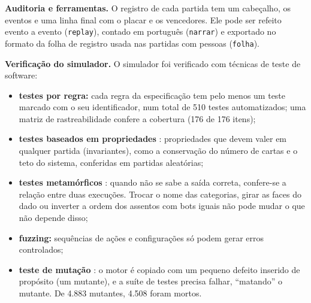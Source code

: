 \textbf{Auditoria e ferramentas.} O registro de cada partida tem um cabeçalho, os eventos e uma linha final com
o placar e os vencedores. Ele pode ser refeito evento a evento (\texttt{replay}), contado em português
(\texttt{narrar}) e exportado no formato da folha de registro usada nas partidas com pessoas (\texttt{folha}).

\textbf{Verificação do simulador.} O simulador foi verificado com técnicas de teste de software:
\begin{itemize}
  \item \textbf{testes por regra:} cada regra da especificação tem pelo menos um teste marcado com o seu
    identificador, num total de 510 testes automatizados; uma matriz de rastreabilidade confere a cobertura (176
    de 176 itens);
  \item \textbf{testes baseados em propriedades} \cite{claessen2000,maciver2019}: propriedades que devem valer em
    qualquer partida (invariantes), como a conservação do número de cartas e o teto do sistema, conferidas em
    partidas aleatórias;
  \item \textbf{testes metamórficos} \cite{chen1998,segura2016}: quando não se sabe a saída correta, confere-se a
    relação entre duas execuções. Trocar o nome das categorias, girar as faces do dado ou inverter a ordem dos
    assentos com bots iguais não pode mudar o que não depende disso;
  \item \textbf{fuzzing:} sequências de ações e configurações  só podem gerar
    erros controlados;
  \item \textbf{teste de mutação} \cite{jia2011}: o motor é copiado com um pequeno defeito inserido de propósito
    (um mutante), e a suíte de testes precisa falhar, ``matando'' o mutante. De 4.883 mutantes, 4.508 foram
    mortos.
\end{itemize}

\subsection{\texorpdfstring{}{Requisitos e experimentos}}
\label{sec:requisitos-experimentos}

